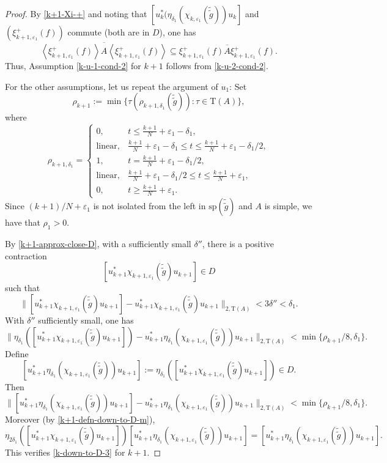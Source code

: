 \documentclass[12pt, oneside, psamsfonts]{amsart}
\theoremstyle{definition}
\theoremstyle{remark}
\numberwithin{equation}{section}
\newcommand{\norm}[1]{\| #1\|}
\newcommand{\eps}{\varepsilon}
\newcommand{\tr}{\mathrm{T}}
\begin{document}
\begin{proof}
By \eqref{k+1-Xi-+} and noting that $ [u_k^*(\eta_{\delta_1}(\chi_{k, \eps_1}(\tilde{\tilde{g}}))u_k]$ and $ (\xi^+_{k+1, \eps_1}(f))$ commute (both are in $D$), one has
$$ \overline{\left< \xi_{k+1, \eps_1}^+(f) \right> A \left< \xi_{k+1, \eps_1}^+(f) \right>} \subseteq \overline{ \xi_{k+1, \eps_1}^+(f) A  \xi_{k+1, \eps_1}^+(f) }.$$
 Thus, Assumption \eqref{k-u-1-cond-2} for $k+1$ follows from \eqref{k-u-2-cond-2}. 
 
For the other assumptions, let us repeat the argument of $u_1$:  Set 
$$ \rho_{k+1}:=\min\{\tau(\rho_{k+1, \delta_1}(\tilde{\tilde{g}})): \tau \in \tr(A)\},$$
where
$$\rho_{k+1, \delta_1} = \left\{
\begin{array}{ll}
0, & t\leq \frac{k+1}{N}+\eps_1-\delta_1, \\
\mathrm{linear}, & \frac{k+1}{N} + \eps_1-\delta_1 \leq t \leq \frac{k+1}{N} + \eps_1-\delta_1/2, \\
1, & t = \frac{k+1}{N} + \eps_1-\delta_1/2, \\
\mathrm{linear}, & \frac{k+1}{N} + \eps_1-\delta_1/2 \leq t \leq \frac{k+1}{N} + \eps_1, \\
0, & t \geq \frac{k+1}{N}+\eps_1.
\end{array}
\right. 
$$
Since $(k+1)/N + \eps_1$ is not isolated from the left in $\mathrm{sp}(\tilde{\tilde{g}})$ and $A$ is simple, we have that $\rho_1>0$.

By \eqref{k+1-approx-close-D}, with a sufficiently small $\delta''$, there is a positive contraction 
$$ [u^*_{k+1}\chi_{k+1, \eps_1}(\tilde{\tilde{g}}) u_{k+1}] \in D $$
such that
\begin{equation*}%
 \norm{ [u^*_{k+1}\chi_{k+1, \eps_1}(\tilde{\tilde{g}}) u_{k+1}] - u^*_{k+1}\chi_{k+1, \eps_1}(\tilde{\tilde{g}}) u_{k+1} }_{2, \tr(A)} < 3\delta''<\delta_1. 
\end{equation*}
With $\delta''$ sufficiently small, one has
$$\norm{ \eta_{\delta_1}([u^*_{k+1}\chi_{k+1, \eps_1}(\tilde{\tilde{g}}) u_{k+1}]) - u^*_{k+1}\eta_{\delta_1}(\chi_{k+1, \eps_1}(\tilde{\tilde{g}})) u_{k+1} }_{2, \tr(A)} < \min\{\rho_{k+1}/8, \delta_1 \}.$$
Define
\begin{equation}\label{k+1-defn-down-to-D-m}
[u^*_{k+1}\eta_{\delta_1}(\chi_{{k+1}, \eps_1}(\tilde{\tilde{g}})) u_{k+1}] := \eta_{\delta_1}([u^*_{k+1}\chi_{k+1, \eps_1}(\tilde{\tilde{g}}) u_{k+1}]) \in D.
\end{equation}
Then
\begin{equation}\label{k+1-down-to-D-2}
 \norm{ [u^*_{k+1}\eta_{\delta_1}(\chi_{k+1, \eps_1}(\tilde{\tilde{g}})) u_{k+1}] - u^*_{k+1}\eta_{\delta_1}(\chi_{k+1, \eps_1}(\tilde{\tilde{g}})) u_{k+1} }_{2, \tr(A)} < \min\{ \rho_{k+1}/8, \delta_1\}.
 \end{equation}
 Moreover (by \eqref{k+1-defn-down-to-D-m}), 
 \begin{equation}\label{k+1-down-to-D-3}
 \eta_{2\delta_1}([u^*_{k+1}\chi_{k+1, \eps_1}(\tilde{\tilde{g}}) u_{k+1}]) [u^*_{k+1}\eta_{\delta_1}(\chi_{k+1, \eps_1}(\tilde{\tilde{g}})) u_{k+1}]  = [u^*_{k+1}\eta_{\delta_1}(\chi_{k+1, \eps_1}(\tilde{\tilde{g}})) u_{k+1}]. 
 \end{equation}
 This verifies %
 \eqref{k-down-to-D-3} for $k+1$.
 

\end{proof}
\end{document}
